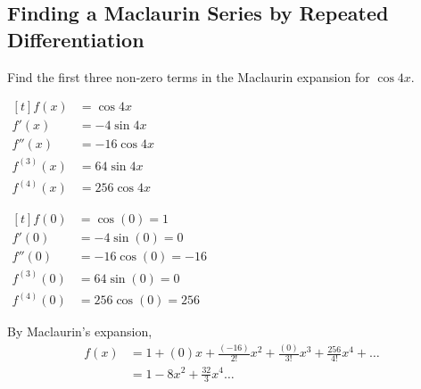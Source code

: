 \documentclass[11pt,a4paper]{book}
\begin{document}
\subsection{Finding a Maclaurin Series by Repeated Differentiation}

\begin{example}

Find the first three non-zero terms in the Maclaurin expansion for
$\cos4x$.

\Solution

\begin{minipage}{0.4\textwidth}

$
\begin{aligned}[t]
f\left(x\right) & =\cos4x\\
f'\left(x\right) & =-4\sin4x\\
f''\left(x\right) & =-16\cos4x\\
f^{\left(3\right)}\left(x\right) & =64\sin4x\\
f^{\left(4\right)}\left(x\right) & =256\cos4x
\end{aligned}
$

\end{minipage}
\vline\hfill
\begin{minipage}{0.5\textwidth}

$
\begin{aligned}[t]
f\left(0\right) & =\cos\left(0\right)=1\\
f'\left(0\right) & =-4\sin\left(0\right)=0\\
f''\left(0\right) & =-16\cos\left(0\right)=-16\\
f^{\left(3\right)}\left(0\right) & =64\sin\left(0\right)=0\\
f^{\left(4\right)}\left(0\right) & =256\cos\left(0\right)=256
\end{aligned}
$

\end{minipage}

\medskip

By Maclaurin's expansion,
\begin{align*}
f\left(x\right) & =1+\left(0\right)x+\frac{\left(-16\right)}{2!}x^{2}+\frac{\left(0\right)}{3!}x^{3}+\frac{256}{4!}x^{4}+\ldots\\
 & =1-8x^{2}+\frac{32}{3}x^{4}\ldots
\end{align*}


\end{example}

\newpage
\end{document}
